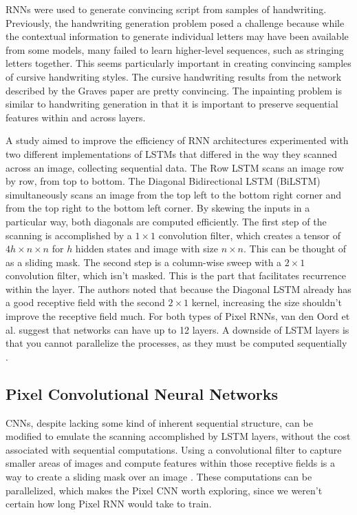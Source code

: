 \documentclass[10pt,twocolumn,letterpaper]{article}
\begin{document}
RNNs were used to generate convincing script from samples of handwriting. Previously, the handwriting generation problem posed a challenge because while the contextual information to generate individual letters may have been available from some models, many failed to learn higher-level sequences, such as stringing letters together. \cite{handwritingRNN} This seems particularly important in creating convincing samples of cursive handwriting styles. The cursive handwriting results from the network described by the Graves paper are pretty convincing. The inpainting problem is similar to handwriting generation in that it is important to preserve sequential features within and across layers.\\

\par
A study aimed to improve the efficiency of RNN architectures experimented with two different implementations of LSTMs that differed in the way they scanned across an image, collecting sequential data. The Row LSTM scans an image row by row, from top to bottom. The Diagonal Bidirectional LSTM (BiLSTM) simultaneously scans an image from the top left to the bottom right corner and from the top right to the bottom left corner. By skewing the inputs in a particular way, both diagonals are computed efficiently. The first step of the scanning is accomplished by a $1 \times 1$ convolution filter, which creates a tensor of $4h \times n \times n$ for $h$ hidden states and image with size $n \times n$. This can be thought of as a sliding mask. The second step is a column-wise sweep with a $2  \times  1$ convolution filter, which isn't masked. This is the part that facilitates recurrence within the layer. The authors noted that because the Diagonal LSTM already has a good receptive field with the second $2  \times  1$ kernel, increasing the size shouldn't improve the receptive field much. For both types of Pixel RNNs, van den Oord et al. suggest that networks can have up to 12 layers. A downside of LSTM layers is that you cannot parallelize the processes, as they must be computed sequentially \cite{pixelRNN}. \\

\subsection{Pixel Convolutional Neural Networks}
CNNs, despite lacking some kind of inherent sequential structure, can be modified to emulate the scanning accomplished by LSTM layers, without the cost associated with sequential computations. Using a convolutional filter to capture smaller areas of images and compute features within those receptive fields is a way to create a sliding mask over an image \cite{pixelRNN}. These computations can be parallelized, which makes the Pixel CNN worth exploring, since we weren't certain how long Pixel RNN would take to train. \\
\end{document}
